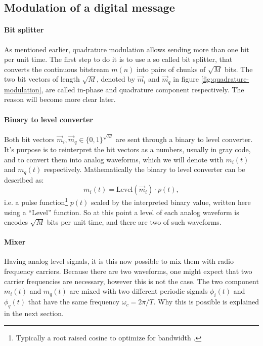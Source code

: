 \subsection{Modulation of a digital message}

\paragraph{Bit splitter}

As mentioned earlier, quadrature modulation allows sending more than one bit per unit time. The first step to do it is to use a so called bit splitter, that converts the continuous bitstream \(m(n)\) into pairs of chunks of \(\sqrt{M}\) bits. The two bit vectors of length \(\sqrt{M}\), denoted by \(\vec{m}_i\) and \(\vec{m}_q\) in figure \ref{fig:quadrature-modulation}, are called in-phase and quadrature component respectively\cite{Hsu}. The reason will become more clear later.

\paragraph{Binary to level converter}


Both bit vectors \(\vec{m}_i, \vec{m}_q \in \{0,1\}^{\sqrt{M}}\) are sent through a binary to level converter. It's purpose is to reinterpret the bit vectors as a numbers, usually in gray code, and to convert them into analog waveforms, which we will denote with \(m_i(t)\) and \(m_q(t)\) respectively. Mathematically the binary to level converter can be described as:
\begin{equation}
	m_i(t) = \text{Level}(\vec{m}_i) \cdot p(t),
\end{equation}
i.e. a pulse function\footnote{Typically a root raised cosine to optimize for bandwidth \cite{Hsu}.} \(p(t)\) scaled by the interpreted binary value, written here using a ``Level'' function. So at this point a level of each analog waveform is encodes \(\sqrt{M}\) bits per unit time, and there are two of such waveforms.


\paragraph{Mixer}

Having analog level signals, it is this now possible to mix them with radio frequency carriers. Because there are two waveforms, one might expect that two carrier frequencies are necessary, however this is not the case. The two component \(m_i(t)\) and \(m_q(t)\) are mixed with two different periodic signals \(\phi_i(t)\) and \(\phi_q(t)\) that have the same frequency \(\omega_c = 2\pi / T\). Why this is possible is explained in the next section.


